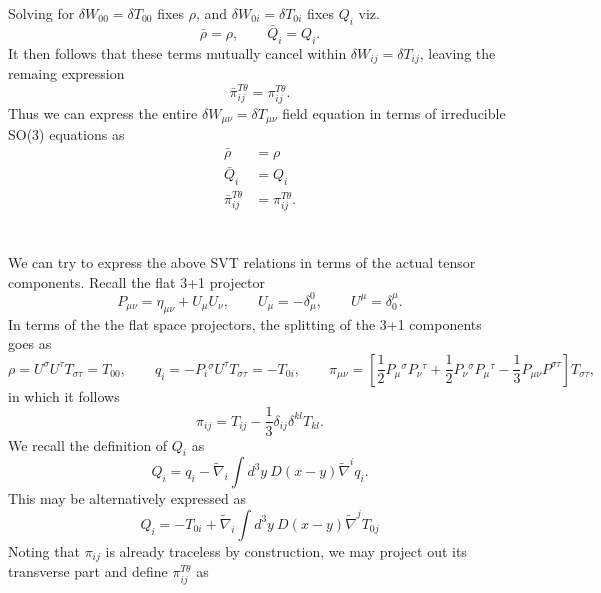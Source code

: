 \documentclass[10pt,letterpaper]{article}
\begin{document}
Solving for $\delta W_{00} =\delta T_{00}$ fixes $\rho$, and $\delta W_{0i} = \delta T_{0i}$ fixes $Q_i$ viz.
\begin{equation}
\bar\rho = \rho,\qquad
\bar Q_i = Q_i. 
\end{equation}
It then follows that these terms mutually cancel within $\delta W_{ij} = \delta T_{ij}$, leaving the remaing expression
\begin{equation}
\bar \pi_{ij}^{T\theta} = \pi_{ij}^{T\theta}.
\end{equation}
Thus we can express the entire $\delta W_{\mu\nu} = \delta T_{\mu\nu}$ field equation in terms of irreducible SO(3) equations as
\begin{align}
\bar \rho& = \rho
\nonumber\\
\bar Q_i &= Q_i
\nonumber\\
\bar \pi_{ij}^{T\theta} &= \pi_{ij}^{T\theta}.
\end{align}
\\ \\
We can try to express the above SVT relations in terms of the actual tensor components. Recall the flat 3+1 projector
\begin{equation}
P_{\mu\nu} = \eta_{\mu\nu}+U_{\mu}U_{\nu},\qquad U_{\mu} = -\delta^0_\mu,\qquad U^\mu = \delta^\mu_0.
\end{equation}
In terms of the the flat space projectors, the splitting of the 3+1 components goes as
\begin{equation}
\rho = U^\sigma U^\tau T_{\sigma\tau} = T_{00} ,\qquad q_{i} = -P_i{}^\sigma U^\tau T_{\sigma\tau} = -T_{0i},\qquad
\pi_{\mu\nu} = \left[ \frac12 P_\mu{}^\sigma P_\nu{}^\tau + \frac12 P_\nu{}^\sigma P_\mu{}^\tau - \frac13 P_{\mu\nu}P^{\sigma\tau}\right]T_{\sigma\tau},
\end{equation}
in which it follows 
\begin{equation}
\pi_{ij} = T_{ij} -\frac13 \delta_{ij} \delta^{kl}T_{kl}.
\end{equation}
We recall the definition of $Q_i$ as
\begin{equation}
Q_i = q_i - \tilde\nabla_i \int d^3y\ D(x-y)\tilde\nabla^i q_i.
\end{equation}
This may be alternatively expressed as
\begin{equation}
Q_i = -T_{0i} + \tilde\nabla_i \int d^3y\ D(x-y)\tilde\nabla^j T_{0j}
\end{equation}
Noting that $\pi_{ij}$ is already traceless by construction, we may project out its transverse part and define $\pi^{T\theta}_{ij}$ as
\end{document}
